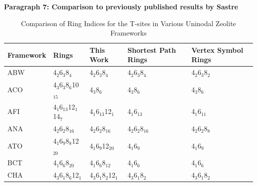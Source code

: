 \documentclass[11pt]{article}
\begin{document}
\textbf{\textbf{Paragraph 7: Comparison to previously published results by Sastre}}
\begin{table}[htbp]
\caption{Comparison of Ring Indices for the T-sites in Various Uninodal Zeolite Frameworks \label{tab:ring-counts}}
\centering
\begin{tabular}{lllll}
Framework & Rings & This Work & Shortest Path Rings \cite{sastre-topological-2009} & Vertex Symbol Rings \cite{baerlocher-database-nodate}\\
\hline
ABW & 4\(_{\text{2}}\)\textbullet{}6\(_{\text{3}}\)\textbullet{}8\(_{\text{4}}\) & 4\(_{\text{2}}\)\textbullet{}6\(_{\text{3}}\)\textbullet{}8\(_{\text{4}}\) & 4\(_{\text{2}}\)\textbullet{}6\(_{\text{3}}\)\textbullet{}8\(_{\text{4}}\) & 4\(_{\text{2}}\)\textbullet{}6\(_{\text{3}}\)\textbullet{}8\(_{\text{2}}\)\\
ACO & 4\(_{\text{3}}\)\textbullet{}6\(_{\text{3}}\)\textbullet{}8\(_{\text{6}}\)\textbullet{}10\(_{\text{15}}\) & 4\(_{\text{3}}\)\textbullet{}8\(_{\text{6}}\) & 4\(_{\text{3}}\)\textbullet{}8\(_{\text{6}}\) & 4\(_{\text{3}}\)\textbullet{}8\(_{\text{6}}\)\\
AFI & 4\(_{\text{1}}\)\textbullet{}6\(_{\text{13}}\)\textbullet{}12\(_{\text{1}}\)\textbullet{}14\(_{\text{7}}\) & 4\(_{\text{1}}\)\textbullet{}6\(_{\text{13}}\)\textbullet{}12\(_{\text{1}}\) & 4\(_{\text{1}}\)\textbullet{}6\(_{\text{13}}\) & 4\(_{\text{1}}\)\textbullet{}6\(_{\text{11}}\)\\
ANA & 4\(_{\text{2}}\)\textbullet{}6\(_{\text{2}}\)\textbullet{}8\(_{\text{16}}\) & 4\(_{\text{2}}\)\textbullet{}6\(_{\text{2}}\)\textbullet{}8\(_{\text{16}}\) & 4\(_{\text{2}}\)\textbullet{}6\(_{\text{2}}\)\textbullet{}8\(_{\text{16}}\) & 4\(_{\text{2}}\)\textbullet{}6\(_{\text{2}}\)\textbullet{}8\(_{\text{8}}\)\\
ATO & 4\(_{\text{1}}\)\textbullet{}6\(_{\text{9}}\)\textbullet{}8\(_{\text{8}}\)\textbullet{}12\(_{\text{20}}\) & 4\(_{\text{1}}\)\textbullet{}6\(_{\text{9}}\)\textbullet{}12\(_{\text{20}}\) & 4\(_{\text{1}}\)\textbullet{}6\(_{\text{9}}\) & 4\(_{\text{1}}\)\textbullet{}6\(_{\text{9}}\)\\
BCT & 4\(_{\text{1}}\)\textbullet{}6\(_{\text{6}}\)\textbullet{}8\(_{\text{20}}\) & 4\(_{\text{1}}\)\textbullet{}6\(_{\text{6}}\)\textbullet{}8\(_{\text{12}}\) & 4\(_{\text{1}}\)\textbullet{}6\(_{\text{6}}\) & 4\(_{\text{1}}\)\textbullet{}6\(_{\text{6}}\)\\
CHA & 4\(_{\text{3}}\)\textbullet{}6\(_{\text{1}}\)\textbullet{}8\(_{\text{6}}\)\textbullet{}12\(_{\text{1}}\) & 4\(_{\text{3}}\)\textbullet{}6\(_{\text{1}}\)\textbullet{}8\(_{\text{2}}\)\textbullet{}12\(_{\text{1}}\) & 4\(_{\text{3}}\)\textbullet{}6\(_{\text{1}}\)\textbullet{}8\(_{\text{2}}\) & 4\(_{\text{3}}\)\textbullet{}6\(_{\text{1}}\)\textbullet{}8\(_{\text{2}}\)\\

\end{tabular}
\end{table}
\end{document}
